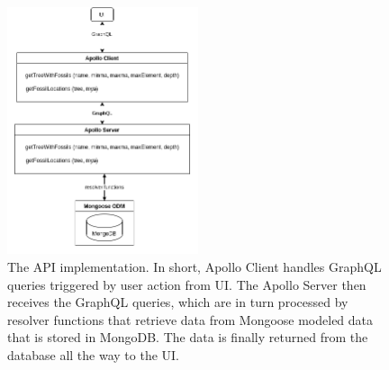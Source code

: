 \documentclass[11pt, a4paper,oneside,chapterprefix=false]{scrbook}
\begin{document}
\begin{figure}[h]
	\centering
	\includegraphics[width=0.5\textwidth]{figures/implementation/api}
	\caption{The API implementation. In short, Apollo Client handles GraphQL queries triggered by user action from UI. The Apollo Server then receives the GraphQL queries, which are in turn processed by resolver functions that retrieve data from Mongoose modeled data that is stored in MongoDB. The data is finally returned from the database all the way to the UI. }
	\label{fig:api}
\end{figure}
\end{document}
